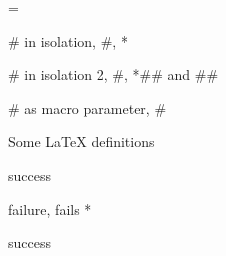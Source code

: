 \errorcontextlines=\maxdimen
\RequirePackage{qstest}
\begin{qstest}{# in isolation}{\Expect, #, \unexpanded}
  *{}
\end{qstest}
\begin{qstest}{# in isolation 2}{\Expect, #, \string}
  *{\string#\string# and \string#\string#}
\end{qstest}
\begin{qstest}{# as macro parameter}{\Expect, #}
  \Expect\expandafter{\the\toks0}{\def\xxx#1{}}
\end{qstest}
\makeatletter
\begin{qstest}{Some LaTeX definitions}{\Expect}
  \Expect*{\the\maxdimen}{16383.99998pt}
\end{qstest}
\RequirePackage{ifthen}
\begin{qstest}{\ExpectIfThen}{\ExpectIfThen}
\end{qstest}
\begin{qstest}{\InRange success}{\InRange}
  \dimen@=10pt
  \Expect*{\the\dimen@}\InRange{5pt}{15pt}
  \Expect*{\the\dimen@}\InRange{10pt}{15pt}
  \Expect*{\the\dimen@}\InRange{5pt}{10pt}
\end{qstest}
\begin{qstest}{\InRange failure}{\InRange, fails}
  \dimen@=10pt \dimen@ii=9.99998pt
  \Expect*{\the\dimen@}\InRange{5pt}{\dimen@ii}
  \dimen@ii=10.00002pt
  \Expect*{\the\dimen@}*\InRange{\the\dimen@ii}{15pt}
\end{qstest}
\begin{qstest}{\NearTo success}{\NearTo}
  \dimen@=10pt
  \Expect*{\the\dimen@}\NearTo{10.05pt}
  \Expect*{\the\dimen@}\NearTo{9.95pt}
  \Expect*{\the\dimen@}\NearTo[2pt]{12pt}
  \Expect*{\the\dimen@}\NearTo[0.1pt]{9.9pt}
\end{qstest}
